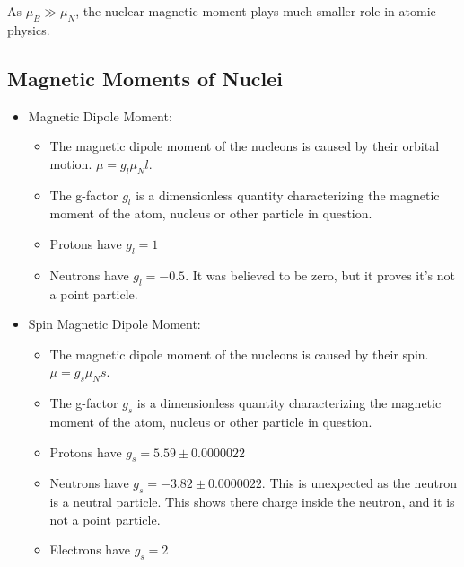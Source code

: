 \documentclass{article}
\begin{document}
As $μ_{B} ≫ μ_{N}$, the nuclear magnetic moment plays much smaller role in atomic physics.

\subsection{Magnetic Moments of Nuclei}
\begin{itemize}
    \item Magnetic Dipole Moment:
    \begin{itemize}
        \item The magnetic dipole moment of the nucleons is caused by their orbital motion. $μ = g_l μ_{N}l$. 
        \item The g-factor $g_l$ is a dimensionless quantity characterizing the magnetic moment of the atom, nucleus or other particle in question. 
        \item Protons have $g_l = 1$
        \item Neutrons have $g_l = -0.5$. It was believed to be zero, but it proves it's not a point particle.
    \end{itemize}
    \item Spin Magnetic Dipole Moment:
    \begin{itemize}
        \item The magnetic dipole moment of the nucleons is caused by their spin. $μ = g_s μ_{N}s$.
        \item The g-factor $g_s$ is a dimensionless quantity characterizing the magnetic moment of the atom, nucleus or other particle in question.
        \item Protons have $g_s = 5.59 ± 0.0000022$
        \item Neutrons have $g_s = -3.82 ± 0.0000022$. This is unexpected as the neutron is a neutral particle. This shows there charge inside the neutron, and it is not a point particle.
        \item Electrons have $g_s = 2$
    \end{itemize}
\end{itemize}
\end{document}
